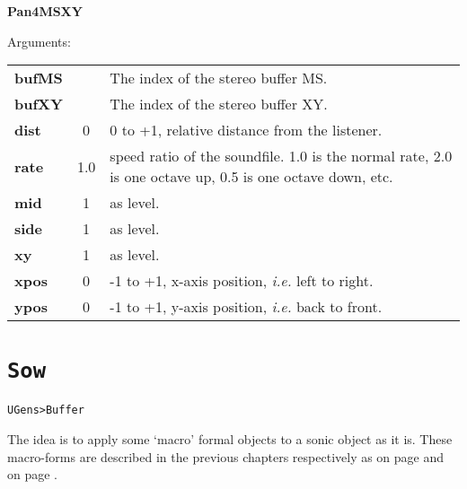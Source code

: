 \begin{addmargin}[1em]{0em}%
\begin{mdframed}[style=mystyle]

\bigskip

{\large \textbf{Pan4MSXY}}

\hrulefill

\color{gray!80}Arguments:\color{black} 

\bigskip

\begin{tabular}{l c p{7.5cm}}
\textbf{bufMS} &  & The index of the stereo buffer MS.\\
\textbf{bufXY} &  & The index of the stereo buffer XY.\\
\textbf{dist} & 0 &  0 to +1, relative distance from the listener. \\
\textbf{rate} & 1.0 & speed ratio  of the soundfile. 1.0 is the normal rate, 2.0 is one octave up, 0.5 is one octave down, etc.\\
\textbf{mid} & 1 & as level. \\
\textbf{side} & 1 &  as level.\\
\textbf{xy} & 1 & as level.\\
\textbf{xpos} & 0 &  -1 to +1, x-axis position, \textit{i.e.} left to right.\\
\textbf{ypos} & 0 &  -1 to +1, y-axis position, \textit{i.e.} back to front.%
\end{tabular}

\bigskip

\end{mdframed}
\end{addmargin}


\section{\texttt{Sow}}
\label{cfso}

\texttt{UGens>Buffer}

\bigskip

The idea is to apply some `macro' formal objects to a sonic object as it is. These macro-forms are described in the previous chapters respectively as  on page \pageref{imp2} and  on page \pageref{imp3}.

